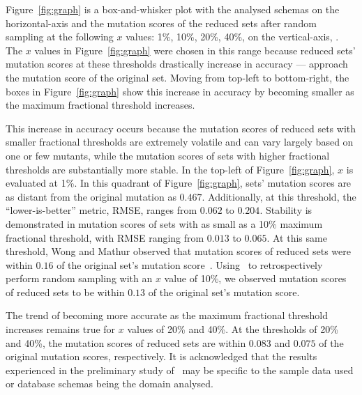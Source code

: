 Figure~\ref{fig:graph} is a box-and-whisker plot with the analysed schemas on the horizontal-axis and the mutation scores of the reduced
sets after random sampling at the following $x$ values: 1\%, 10\%, 20\%, 40\%, on the vertical-axis, .
The $x$ values in Figure~\ref{fig:graph} were chosen in this range because reduced sets' mutation scores at these thresholds
drastically increase in accuracy --- approach the mutation score of the original set. Moving from top-left to bottom-right, the boxes in
Figure~\ref{fig:graph} show this increase in accuracy by becoming smaller as the maximum fractional threshold increases.

This increase in accuracy occurs because the mutation scores of reduced sets with smaller fractional thresholds are extremely volatile
and can vary largely based on one or few mutants, while the mutation scores of sets with higher fractional thresholds are substantially
more stable. In the top-left of Figure~\ref{fig:graph}, $x$ is evaluated at 1\%. In this quadrant of Figure~\ref{fig:graph}, sets' mutation
scores are as distant from the original mutation as $0.467$. Additionally, at this threshold, the ``lower-is-better'' metric,
RMSE, ranges from $0.062$ to $0.204$. Stability is demonstrated in mutation scores of sets with as small as a 10\% maximum fractional
threshold, with RMSE ranging from $0.013$ to $0.065$. At this same threshold, Wong and Mathur observed that mutation
scores of reduced sets were within $0.16$ of the original set's mutation score~\cite{mathur1994empirical, wong1993mutation}. Using \mr~to
retrospectively perform random sampling with an $x$ value of 10\%, we observed mutation scores of reduced sets to be within $0.13$ of the
original set's mutation score.

The trend of becoming more accurate as the maximum fractional threshold increases remains true for $x$ values of 20\% and 40\%. At the
thresholds of 20\% and 40\%, the mutation scores of reduced sets are within $0.083$ and $0.075$ of the original mutation scores,
respectively. It is acknowledged that the results experienced in the preliminary study of \mr~may be specific to the sample data used or
database schemas being the domain analysed.



